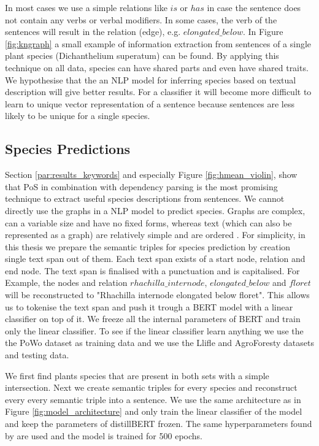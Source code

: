 \documentclass[a4paper, 12pt, oneside]{book} %
\begin{document}
In most cases we use a simple relations like $is$ or $has$ in case the sentence does not contain any verbs or verbal modifiers.
In some cases, the verb of the sentences will result in the relation (edge), e.g. $elongated\_below$.
In Figure \ref{fig:kngraph} a small example of information extraction from sentences of a single plant species (Dichanthelium superatum) can be found.
By applying this technique on all data, species can have shared parts and even have shared traits.
We hypothesise that the an NLP model for inferring species based on textual description will give better results.
For a classifier it will become more difficult to learn to unique vector representation of a sentence because sentences are less likely to be unique for a single species.


\subsection{Species Predictions}
Section \ref{par:results_keywords} and especially Figure \ref{fig:hmean_violin}, show that PoS in combination with dependency parsing is the most promising technique to extract useful species descriptions from sentences.
We cannot directly use the graphs in a NLP model to predict species.
Graphs are complex, can a variable size and have no fixed forms, whereas text (which can also be represented as a graph) are relatively simple and are ordered \autocite{sanchez-lengeling_gentle_2021}. 
For simplicity, in this thesis we prepare the semantic triples for species prediction by creation single text span out of them.
Each text span exists of a start node, relation and end node.
The text span is finalised with a punctuation and is capitalised.
For Example, the nodes and relation $rhachilla\_internode$, $elongated\_below$ and $floret$ will be reconstructed to "Rhachilla internode elongated below floret".
This allows us to tokenise the text span and push it trough a BERT model with a linear classifier on top of it.
We freeze all the internal parameters of BERT and train only the linear classifier.
To see if the linear classifier learn anything we use the the PoWo dataset as training data and we use the Llifle and AgroForesty datasets and testing data.

We first find plants species that are present in both sets with a simple intersection.
Next we create semantic triples for every species and reconstruct every every semantic triple into a sentence.
We use the same architecture as in Figure \ref{fig:model_architecture} and only train the linear classifier of the model and keep the parameters of distillBERT frozen.
The same hyperparameters found by \textcite{sun_how_2020} are used and the model is trained for 500 epochs.
\end{document}
